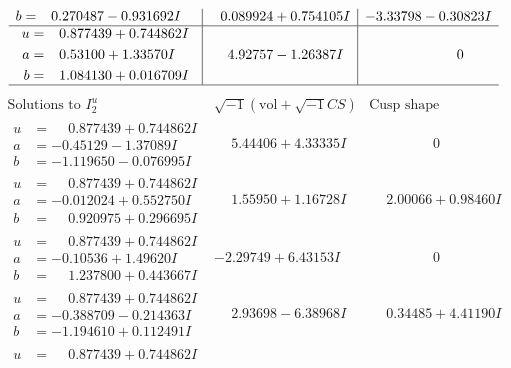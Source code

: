 \documentclass[1p]{elsarticle_modified}
\theoremstyle{definition}
\newcommand{\I}{\sqrt{-1}}
\begin{document}
$$\begin{array}{c|c|c}
\begin{aligned}
b &= \phantom{-}0.270487 - 0.931692 I\end{aligned}
 & \phantom{-}0.089924 + 0.754105 I & -3.33798 - 0.30823 I \\ \hline\begin{aligned}
u &= \phantom{-}0.877439 + 0.744862 I \\
a &= \phantom{-}0.53100 + 1.33570 I \\
b &= \phantom{-}1.084130 + 0.016709 I\end{aligned}
 & \phantom{-}4.92757 - 1.26387 I & \phantom{-0.000000 } 0\\
 \hline 
 \end{array}$$\newpage$$\begin{array}{c|c|c}  
\text{Solutions to }I^u_{2}& \I (\text{vol} + \sqrt{-1}CS) & \text{Cusp shape}\\
 \hline 
\begin{aligned}
u &= \phantom{-}0.877439 + 0.744862 I \\
a &= -0.45129 - 1.37089 I \\
b &= -1.119650 - 0.076995 I\end{aligned}
 & \phantom{-}5.44406 + 4.33335 I & \phantom{-0.000000 } 0 \\ \hline\begin{aligned}
u &= \phantom{-}0.877439 + 0.744862 I \\
a &= -0.012024 + 0.552750 I \\
b &= \phantom{-}0.920975 + 0.296695 I\end{aligned}
 & \phantom{-}1.55950 + 1.16728 I & \phantom{-}2.00066 + 0.98460 I \\ \hline\begin{aligned}
u &= \phantom{-}0.877439 + 0.744862 I \\
a &= -0.10536 + 1.49620 I \\
b &= \phantom{-}1.237800 + 0.443667 I\end{aligned}
 & -2.29749 + 6.43153 I & \phantom{-0.000000 } 0 \\ \hline\begin{aligned}
u &= \phantom{-}0.877439 + 0.744862 I \\
a &= -0.388709 - 0.214363 I \\
b &= -1.194610 + 0.112491 I\end{aligned}
 & \phantom{-}2.93698 - 6.38968 I & \phantom{-}0.34485 + 4.41190 I \\ \hline\begin{aligned}
u &= \phantom{-}0.877439 + 0.744862 I \\

\end{aligned}
\end{array}$$
\end{document}
